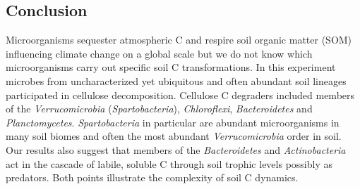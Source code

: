 \subsection{Conclusion} 
Microorganisms sequester atmospheric C and respire soil organic matter (SOM)
influencing climate change on a global scale but we do not know which
microorganisms carry out specific soil C transformations. In this experiment
microbes from uncharacterized yet ubiquitous and often abundant soil lineages
participated in cellulose decomposition. Cellulose C degraders included members
of the \textit{Verrucomicrobia} (\textit{Spartobacteria}),
\textit{Chloroflexi}, \textit{Bacteroidetes} and \textit{Planctomycetes}.
\textit{Spartobacteria} in particular are abundant microorganisms in many soil
biomes and often the most abundant \textit{Verrucomicrobia} order in soil. Our
results also suggest that members of the \textit{Bacteroidetes} and
\textit{Actinobacteria} act in the cascade of labile, soluble C through soil
trophic levels possibly as predators. Both points illustrate the complexity of
soil C dynamics.
